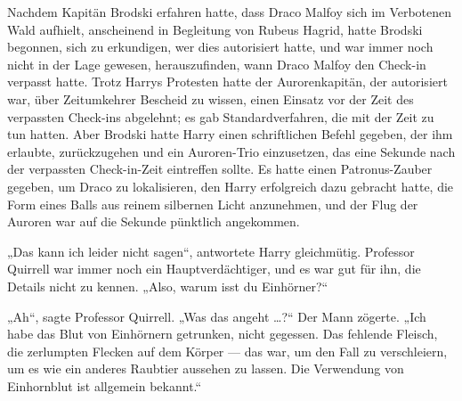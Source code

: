 Nachdem Kapitän Brodski erfahren hatte, dass Draco Malfoy sich im Verbotenen Wald aufhielt, anscheinend in Begleitung von Rubeus Hagrid, hatte Brodski begonnen, sich zu erkundigen, wer dies autorisiert hatte, und war immer noch nicht in der Lage gewesen, herauszufinden, wann Draco Malfoy den Check-in verpasst hatte. Trotz Harrys Protesten hatte der Aurorenkapitän, der autorisiert war, über Zeitumkehrer Bescheid zu wissen, einen Einsatz vor der Zeit des verpassten Check-ins abgelehnt; es gab Standardverfahren, die mit der Zeit zu tun hatten. Aber Brodski hatte Harry einen schriftlichen Befehl gegeben, der ihm erlaubte, zurückzugehen und ein Auroren-Trio einzusetzen, das eine Sekunde nach der verpassten Check-in-Zeit eintreffen sollte. Es hatte einen Patronus-Zauber gegeben, um Draco zu lokalisieren, den Harry erfolgreich dazu gebracht hatte, die Form eines Balls aus reinem silbernen Licht anzunehmen, und der Flug der Auroren war auf die Sekunde pünktlich angekommen.

„Das kann ich leider nicht sagen“, antwortete Harry gleichmütig. Professor Quirrell war immer noch ein Hauptverdächtiger, und es war gut für ihn, die Details nicht zu kennen.
„Also, warum isst du Einhörner?“

„Ah“, sagte Professor Quirrell.
„Was das angeht …?“ Der Mann zögerte.
„Ich habe das Blut von Einhörnern getrunken, nicht gegessen. Das fehlende Fleisch, die zerlumpten Flecken auf dem Körper — das war, um den Fall zu verschleiern, um es wie ein anderes Raubtier aussehen zu lassen. Die Verwendung von Einhornblut ist allgemein bekannt.“

